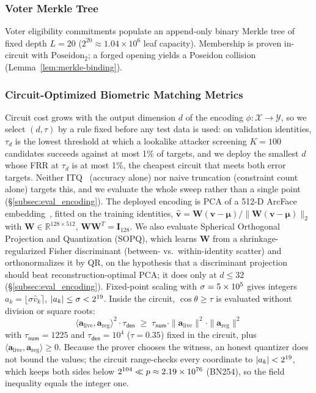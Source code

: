 \documentclass[10pt,letterpaper,journal]{IEEEtran}
\begin{document}
\subsubsection{Voter Merkle Tree}
Voter eligibility commitments populate an append-only binary Merkle tree of fixed depth $L = 20$ ($2^{20} \approx 1.04 \times 10^6$ leaf capacity). Membership is proven in-circuit with $\text{Poseidon}_2$; a forged opening yields a Poseidon collision (Lemma~\ref{lem:merkle-binding}).

\subsubsection{Circuit-Optimized Biometric Matching Metrics}
\label{sec:metric_formulation}
Circuit cost grows with the output dimension $d$ of the encoding $\phi: \mathcal{X} \to \mathcal{Y}$, so we select $(d, \tau)$ by a rule fixed before any test data is used: on validation identities, $\tau_d$ is the lowest threshold at which a lookalike attacker screening $K = 100$ candidates succeeds against at most 1\% of targets, and we deploy the smallest $d$ whose FRR at $\tau_d$ is at most 1\%, the cheapest circuit that meets both error targets. Neither ITQ~\cite{Gong2013} (accuracy alone) nor naive truncation (constraint count alone) targets this, and we evaluate the whole sweep rather than a single point (\S\ref{subsec:eval_encoding}).
The deployed encoding is PCA of a 512-D ArcFace embedding~\cite{Deng2019ArcFace}, fitted on the training identities, $\hat{\mathbf{v}} = \mathbf{W}(\mathbf{v} - \boldsymbol{\mu}) / \|\mathbf{W}(\mathbf{v} - \boldsymbol{\mu})\|_2$ with $\mathbf{W} \in \mathbb{R}^{128 \times 512}$, $\mathbf{W}\mathbf{W}^T = \mathbf{I}_{128}$. We also evaluate Spherical Orthogonal Projection and Quantization (SOPQ), which learns $\mathbf{W}$ from a shrinkage-regularized Fisher discriminant (between- vs.\ within-identity scatter) and orthonormalizes it by QR, on the hypothesis that a discriminant projection should beat reconstruction-optimal PCA; it does only at $d \le 32$ (\S\ref{subsec:eval_encoding}). Fixed-point scaling with $\sigma = 5 \times 10^{5}$ gives integers $a_k = \lfloor \sigma \hat{v}_k \rceil$, $|a_k| \le \sigma < 2^{19}$. Inside the circuit, $\cos\theta \ge \tau$ is evaluated without division or square roots:
\begin{equation}
\label{eq:sopq-circuit}
\langle \mathbf{a}_{\text{live}}, \mathbf{a}_{\text{reg}} \rangle^2 \cdot \tau_{\mathsf{den}} \;\ge\; \tau_{\mathsf{num}} \cdot \|\mathbf{a}_{\text{live}}\|^2 \cdot \|\mathbf{a}_{\text{reg}}\|^2
\end{equation}
with $\tau_{\mathsf{num}} = 1225$ and $\tau_{\mathsf{den}} = 10^4$ ($\tau = 0.35$) fixed in the circuit, plus $\langle \mathbf{a}_{\text{live}}, \mathbf{a}_{\text{reg}} \rangle \ge 0$. Because the prover chooses the witness, an honest quantizer does not bound the values; the circuit range-checks every coordinate to $|a_k| < 2^{19}$, which keeps both sides below $2^{104} \ll p \approx 2.19 \times 10^{76}$ (BN254), so the field inequality equals the integer one.
\end{document}
